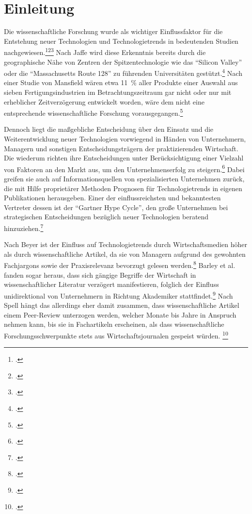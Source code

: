\section{Einleitung}
Die wissenschaftliche Forschung wurde als wichtiger Einflussfaktor für die Entstehung neuer Technologien und Technologietrends in bedeutenden Studien nachgewiesen.\footcite[Vgl.][S.~187]{Nelson1986}\footcite[Vgl.][S.~11]{Mansfield1991}\footcite[Vgl.][S.~599]{Tegarden2012} Nach Jaffe wird diese Erkenntnis bereits durch die geographische Nähe von Zentren der Spitzentechnologie wie das "`Silicon Valley"' oder die "`Massachusetts Route 128"' zu führenden Universitäten gestützt.\footcite[Vgl.][S.~967f]{Jaffe1989} Nach einer Studie von Mansfield wären etwa 11~\% aller Produkte einer Auswahl aus sieben Fertigungsindustrien im Betrachtungszeitraum gar nicht oder nur mit erheblicher Zeitverzögerung entwickelt worden, wäre dem nicht eine entsprechende wissenschaftliche Forschung vorausgegangen.\footcite[Vgl.][S.~2]{Mansfield1991}

Dennoch liegt die maßgebliche Entscheidung über den Einsatz und die Weiterentwicklung neuer Technologien vorwiegend in Händen von Unternehmern, Managern und sonstigen Entscheidungsträgern der praktizierenden Wirtschaft. Die wiederum richten ihre Entscheidungen unter Berücksichtigung einer Vielzahl von Faktoren an den Markt aus, um den Unternehmenserfolg zu steigern.\footcite[Vgl.][S.~1652f]{Gruber2008} Dabei greifen sie auch auf Informationsquellen von spezialisierten Unternehmen zurück, die mit Hilfe proprietärer Methoden Prognosen für Technologietrends in eigenen Publikationen herausgeben. Einer der einflussreichsten und bekanntesten Vertreter dessen ist der "`Gartner Hype Cycle"', den große Unternehmen bei strategischen Entscheidungen bezüglich neuer Technologien beratend hinzuziehen.\footcite[Vgl.][S.~254]{Steinert2010}

Nach Beyer ist der Einfluss auf Technologietrends durch Wirtschaftsmedien höher als durch wissenschaftliche Artikel, da sie von Managern aufgrund des gewohnten Fachjargons sowie der Praxisrelevanz bevorzugt gelesen werden.\footcite[Vgl.][S.~472]{Beyer1992} Barley et al. fanden sogar heraus, dass sich gängige Begriffe der Wirtschaft in wissenschaftlicher Literatur verzögert manifestieren, folglich der Einfluss unidirektional von Unternehmern in Richtung Akademiker stattfindet.\footcite[Vgl.][S.~52]{Barley1988} Nach Spell hängt das allerdings eher damit zusammen, dass wissenschaftliche Artikel einem Peer-Review unterzogen werden, welcher Monate bis Jahre in Anspruch nehmen kann, bis sie in Fachartikeln erscheinen, als dass wissenschaftliche Forschungsschwerpunkte stets aus Wirtschaftsjournalen gespeist würden. \footcite[Vgl.][S.~345]{Spell1999} 

